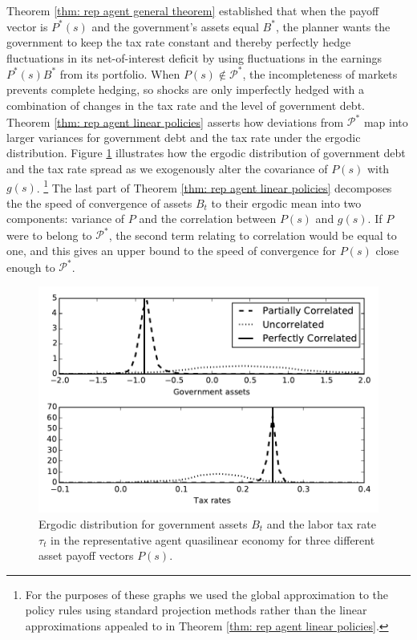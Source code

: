 \documentclass[thmsb,11pt]{article}
\begin{document}
 Theorem \ref{thm: rep agent general theorem} established  that when the payoff vector is $P^*(s)$ and the government's assets equal $B^*$, the
 planner  wants the government  to keep the tax rate constant and thereby perfectly  hedge fluctuations in its net-of-interest deficit
by using fluctuations in the earnings  $P^*(s)B^*$ from its  portfolio.  When $P(s) \not \in \mathcal{P}^*$, the incompleteness of markets prevents complete hedging, so  shocks are only imperfectly
hedged with a combination of changes in the tax rate
and the level of government debt. Theorem \ref{thm: rep agent linear policies}  asserts   how  deviations from $\mathcal{P}^*$ map into larger variances for government debt and the tax rate
under the ergodic distribution. Figure \ref{fig: ergodic distribution ql} illustrates  how the ergodic distribution of government debt and the tax rate spread as we
exogenously alter  the covariance of $P(s)$ with $g(s)$. \footnote{For the purposes of these graphs we used the global approximation to the policy rules using standard projection methods rather than the linear approximations appealed to in Theorem \ref{thm: rep agent linear policies}.} The last part of Theorem \ref{thm: rep agent linear policies} decomposes the the speed of convergence of assets $B_t$ to their ergodic mean into two components: variance of $P$ and the correlation between $P(s)$ and $g(s)$.  If $P$ were to belong to $\mathcal{P}^*$, the second term relating to correlation would be equal to one,  and this gives an upper bound to the speed of convergence for $P(s)$ close enough to $\mathcal{P}^*$. 
 
 
 \begin{figure}[htp]
 \centering
	 \includegraphics[width=5in]{plots/ErgodicQL.pdf}
 \caption{Ergodic distribution for government assets $B_t$ and the labor tax rate $\tau_t$ in the representative agent quasilinear economy for three different
 asset payoff vectors $P(s)$.}
 \label{fig: ergodic distribution ql}
 \end{figure}
\end{document}
